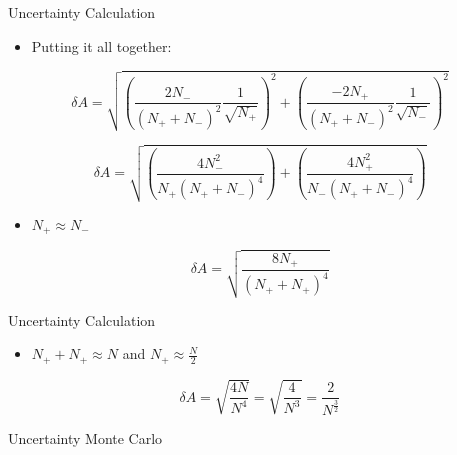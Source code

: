 \documentclass[10pt]{beamer}
\begin{document}
\begin{frame}{Uncertainty Calculation}

	\begin{itemize}
		\item Putting it all together:
	\end{itemize}

	\begin{equation}
		\delta A = \sqrt{ \left( \frac{2N_-}{\left( N_++N_- \right)^2} \frac{1}{\sqrt{N_+}} \right)^2 + \left( \frac{-2N_+}{\left( N_++N_- \right)^2} \frac{1}{\sqrt{N_-}} \right)^2 }
	\end{equation}
	
	\begin{equation}
		\delta A = \sqrt{ \left( \frac{4N_-^2}{N_+ \left( N_++N_- \right)^4} \right) + \left( \frac{4N_+^2}{N_- \left( N_++N_- \right)^4} \right) }
	\end{equation}
	
	\begin{itemize}
		\item $N_+ \approx N_-$
	\end{itemize}
	
	\begin{equation}
		\delta A = \sqrt{\frac{8N_+}{\left( N_+ + N_+ \right)^4}}
	\end{equation}

\end{frame}

\begin{frame}{Uncertainty Calculation}

	\begin{itemize}
		\item $N_+ + N_+ \approx N$ and $N_+ \approx \frac{N}{2}$
	\end{itemize}
	
	\begin{equation}
		\delta A = \sqrt{\frac{4N}{N^4}} = \sqrt{\frac{4}{N^3}} = \frac{2}{N^{\frac{3}{2}}}
	\end{equation}
	
\end{frame}

\begin{frame}{Uncertainty Monte Carlo}



\end{frame}
\end{document}
